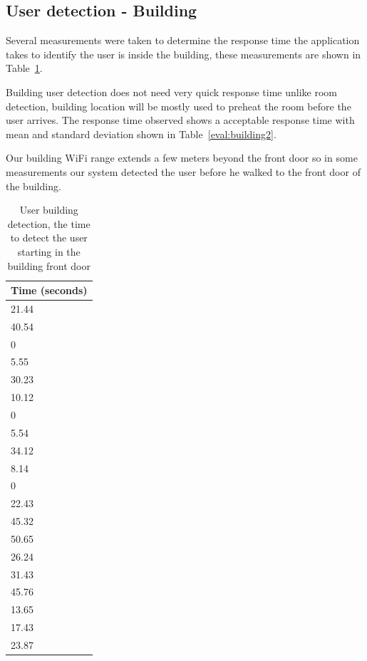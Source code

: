 \subsection{User detection - Building}

Several measurements were taken to determine the response time the application takes to identify the user is inside the building, these measurements are shown in Table~\ref{eval:building1}.

Building user detection does not need very quick response time unlike room detection, building location will be mostly used to preheat the room before the user arrives. The response time observed shows a acceptable response time with mean and standard deviation shown in Table~\ref{eval:building2}.



Our building \ac{WiFi} range extends a few meters beyond the front door so in some measurements our system detected the user before he walked to the front door of the building.







\begin{table}[]
\centering
\begin{tabular}{|l|}
\hline
Time (seconds) \\ \hline
21.44 \\ \hline
40.54 \\ \hline
0 \\ \hline
5.55 \\ \hline
30.23 \\ \hline
10.12 \\ \hline
0 \\ \hline
5.54 \\ \hline
34.12 \\ \hline
8.14 \\ \hline
0 \\ \hline
22.43 \\ \hline
45.32 \\ \hline
50.65 \\ \hline
26.24 \\ \hline
31.43 \\ \hline
45.76 \\ \hline
13.65 \\ \hline
17.43 \\ \hline
23.87 \\ \hline
\end{tabular}
\caption{User building detection, the time to detect the user starting in the building front door}
\label{eval:building1}
\end{table}

